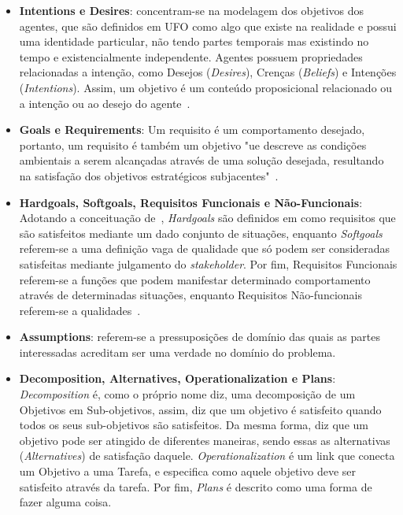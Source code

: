 \begin{itemize}
	\item \textbf{Intentions e Desires}: concentram-se na modelagem dos objetivos dos agentes, que são definidos em UFO como algo que existe na realidade e possui uma identidade particular, não tendo partes temporais mas existindo no tempo e existencialmente independente. Agentes possuem propriedades relacionadas a intenção, como Desejos (\textit{Desires}), Crenças (\textit{Beliefs}) e Intenções (\textit{Intentions}). Assim, um objetivo é um conteúdo proposicional relacionado ou a intenção ou ao desejo do agente~\cite{pedrogoro}.
	\item \textbf{Goals e Requirements}: Um requisito é um comportamento desejado, portanto, um requisito é também um objetivo "ue descreve as condições ambientais a serem alcançadas através de uma solução desejada, resultando na satisfação dos objetivos estratégicos subjacentes"~\cite{pedrogoro}.
	\item \textbf{Hardgoals, Softgoals, Requisitos Funcionais e Não-Funcionais}: Adotando a conceituação de~\cite{guizzardi2014ontological}, \textit{Hardgoals} são definidos em \goro como requisitos que são satisfeitos mediante um dado conjunto de situações, enquanto \textit{Softgoals} referem-se a uma definição vaga de qualidade que só podem ser consideradas satisfeitas mediante julgamento do \textit{stakeholder}. Por fim, Requisitos Funcionais referem-se a funções que podem manifestar determinado comportamento através de determinadas situações, enquanto Requisitos Não-funcionais referem-se a qualidades~\cite{pedrogoro}.
	\item \textbf{Assumptions}: referem-se a pressuposições de domínio das quais as partes interessadas acreditam ser uma verdade no domínio do problema.
	\item \textbf{Decomposition, Alternatives, Operationalization e Plans}: \textit{Decomposition} é, como o próprio nome diz, uma decomposição de um Objetivos em Sub-objetivos, assim, diz que um objetivo é satisfeito quando todos os seus sub-objetivos são satisfeitos. Da mesma forma, diz que um objetivo pode ser atingido de diferentes maneiras, sendo essas as alternativas (\textit{Alternatives}) de satisfação daquele. \textit{Operationalization} é um link que conecta um Objetivo a uma Tarefa, e especifica como aquele objetivo deve ser satisfeito através da tarefa. Por fim, \textit{Plans} é descrito como uma forma de fazer alguma coisa.	
\end{itemize}

